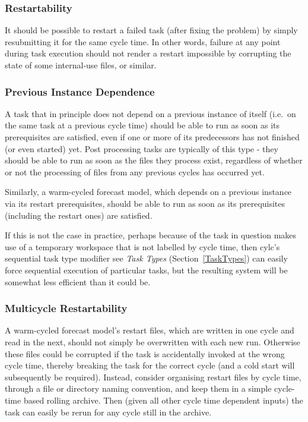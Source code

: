 \documentclass[11pt,a4paper]{article}
\begin{document}
\subsubsection{Restartability}

It should be possible to restart a failed task (after fixing the
problem) by simply resubmitting it for the same cycle time. In other
words, failure at any point during task execution should not render a
restart impossible by corrupting the state of some internal-use files,
or similar. 

\subsubsection{Previous Instance Dependence} 

A task that in principle does not depend on a previous instance of
itself (i.e.\ on the same task at a previous cycle time) should be able
to run as soon as its prerequisites are satisfied, even if one or more
of its predecessors has not finished (or even started) yet.  Post
processing tasks are typically of this type - they should be able to run
as soon as the files they process exist, regardless of whether or not
the processing of files from any previous cycles has occurred yet.

Similarly, a warm-cycled forecast model, which depends on a previous
instance via its restart prerequisites, should be able to run as soon as
its prerequisites (including the restart ones) are satisfied.

If this is not the case in practice, perhaps because of the task in
question makes use of a temporary workspace that is not labelled by
cycle time, then cylc's sequential task type modifier see {\em Task
Types} (Section~\ref{TaskTypes}) can easily force sequential execution
of particular tasks, but the resulting system will be somewhat less
efficient than it could be.

\subsubsection{Multicycle Restartability} 

A warm-cycled forecast model's restart files, which are written in
one cycle and read in the next, should not simply be overwritten with
each new run. Otherwise these files could be corrupted if the task is
accidentally invoked at the wrong cycle time, thereby breaking the task
for the correct cycle (and a cold start will subsequently be required).
Instead, consider organising restart files by cycle time, through a file
or directory naming convention, and keep them in a simple cycle-time
based rolling archive. Then (given all other cycle time dependent
inputs) the task can easily be rerun for any cycle still in the archive.
\end{document}
